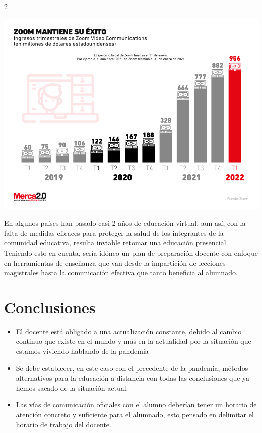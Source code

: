 \documentclass[12pt,spanish,Letterpaper,openany]{book}
\providecommand{\tightlist}{%
  \setlength{\itemsep}{0pt}\setlength{\parskip}{0pt}}
\begin{document}
\begin {multicols}{2}
\begin {flushleft}
\noindent\begin{minipage}[c]{\columnwidth}
\centering

\includegraphics[width=1\linewidth]{images/pareja35_image2}

\end{minipage}
\end {flushleft}

En algunos países han pasado casi 2 años de educación virtual, aun así, con la falta de medidas eficaces para proteger la salud de los integrantes de la comunidad educativa, resulta inviable retomar una educación presencial. Teniendo esto en cuenta, sería idóneo un plan de preparación docente con enfoque en herramientas de enseñanza que van desde la impartición de lecciones magistrales hasta la comunicación efectiva que tanto beneficia al alumnado.

\hypertarget{conclusiones-4}{%
\section{Conclusiones}\label{conclusiones-4}}

\begin{itemize}
\tightlist
\item
  El docente está obligado a una actualización constante, debido al cambio continuo que existe en el mundo y más en la actualidad por la situación que estamos viviendo hablando de la pandemia
\item
  Se debe establecer, en este caso con el precedente de la pandemia, métodos alternativos para la educación a distancia con todas las conclusiones que ya hemos sacado de la situación actual.
\item
  Las vías de comunicación oficiales con el alumno deberían tener un horario de atención concreto y suficiente para el alumnado, esto pensado en delimitar el horario de trabajo del docente.
\end{itemize}


\end{multicols}
\end{document}
